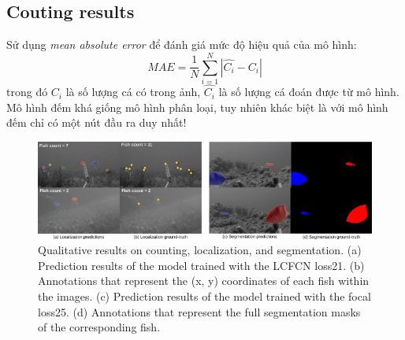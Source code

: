 \documentclass{article}
\begin{document}
        \subsection{Couting results}
        Sử dụng \textit{mean absolute error} để đánh giá mức độ hiệu quả của mô hình:
        $$ MAE = \frac{1}{N}\sum_{i=1}^{N}|\hat{C_i} - C_i|$$
        trong đó $C_i$ là số lượng cá có trong ảnh, $\hat{C_i}$ là số lượng cá đoán được từ mô hình.\\
        Mô hình đếm khá giống mô hình phân loại, tuy nhiên khác biệt là với mô hình đếm chỉ có một nút đầu ra duy nhất!
        
        \begin{figure}[ht!]
            \centering
            \includegraphics[width = \linewidth]{fig4.jpg}
            \caption{Qualitative results on counting, localization, and segmentation. (a) Prediction results of the model trained with the LCFCN loss21. (b) Annotations that represent the (x, y) coordinates of each fish within the images. (c) Prediction results of the model trained with the focal loss25. (d) Annotations that represent the full segmentation masks of the corresponding fish.}
            \label{fig4}
        \end{figure}
        
        
\end{document}
